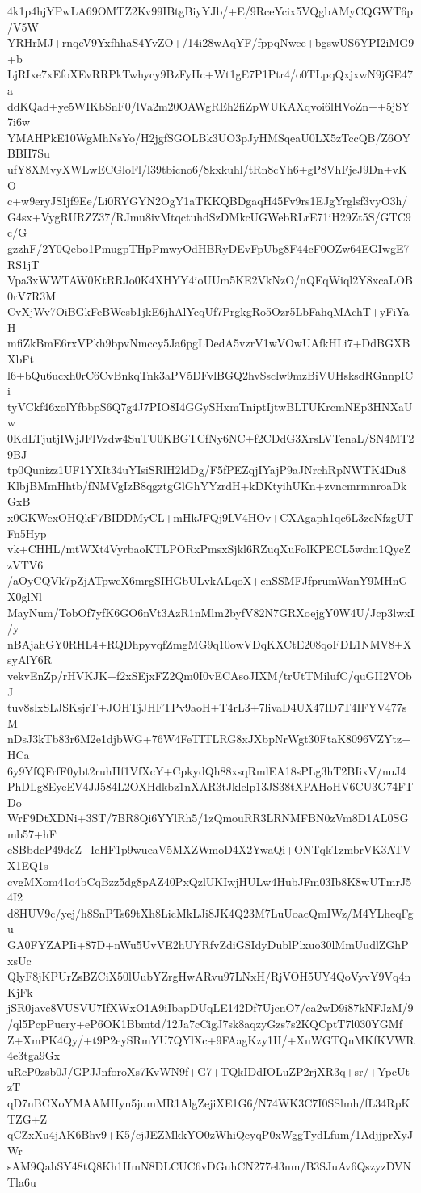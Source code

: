 4k1p4hjYPwLA69OMTZ2Kv99IBtgBiyYJb/+E/9RceYcix5VQgbAMyCQGWT6p/V5W
YRHrMJ+rnqeV9YxfhhaS4YvZO+/14i28wAqYF/fppqNwce+bgswUS6YPI2iMG9+b
LjRIxe7xEfoXEvRRPkTwhycy9BzFyHc+Wt1gE7P1Ptr4/o0TLpqQxjxwN9jGE47a
ddKQad+ye5WIKbSnF0/lVa2m20OAWgREh2fiZpWUKAXqvoi6lHVoZn++5jSY7i6w
YMAHPkE10WgMhNsYo/H2jgfSGOLBk3UO3pJyHMSqeaU0LX5zTccQB/Z6OYBBH7Su
ufY8XMvyXWLwECGloFl/l39tbicno6/8kxkuhl/tRn8cYh6+gP8VhFjeJ9Dn+vKO
c+w9eryJSIjf9Ee/Li0RYGYN2OgY1aTKKQBDgaqH45Fv9rs1EJgYrglsf3vyO3h/
G4sx+VygRURZZ37/RJmu8ivMtqctuhdSzDMkcUGWebRLrE71iH29Zt5S/GTC9c/G
gzzhF/2Y0Qebo1PmugpTHpPmwyOdHBRyDEvFpUbg8F44cF0OZw64EGIwgE7RS1jT
Vpa3xWWTAW0KtRRJo0K4XHYY4ioUUm5KE2VkNzO/nQEqWiql2Y8xcaLOB0rV7R3M
CvXjWv7OiBGkFeBWcsb1jkE6jhAlYcqUf7PrgkgRo5Ozr5LbFahqMAchT+yFiYaH
mfiZkBmE6rxVPkh9bpvNmccy5Ja6pgLDedA5vzrV1wVOwUAfkHLi7+DdBGXBXbFt
l6+bQu6ucxh0rC6CvBnkqTnk3aPV5DFvlBGQ2hvSsclw9mzBiVUHsksdRGnnpICi
tyVCkf46xolYfbbpS6Q7g4J7PIO8I4GGySHxmTniptIjtwBLTUKrcmNEp3HNXaUw
0KdLTjutjIWjJFlVzdw4SuTU0KBGTCfNy6NC+f2CDdG3XrsLVTenaL/SN4MT29BJ
tp0Qunizz1UF1YXIt34uYIsiSRlH2ldDg/F5fPEZqjIYajP9aJNrchRpNWTK4Du8
KlbjBMmHhtb/fNMVgIzB8qgztgGlGhYYzrdH+kDKtyihUKn+zvncmrmnroaDkGxB
x0GKWexOHQkF7BIDDMyCL+mHkJFQj9LV4HOv+CXAgaph1qc6L3zeNfzgUTFn5Hyp
vk+CHHL/mtWXt4VyrbaoKTLPORxPmsxSjkl6RZuqXuFolKPECL5wdm1QycZzVTV6
/aOyCQVk7pZjATpweX6mrgSIHGbULvkALqoX+cnSSMFJfprumWanY9MHnGX0glNl
MayNum/TobOf7yfK6GO6nVt3AzR1nMlm2byfV82N7GRXoejgY0W4U/Jcp3lwxI/y
nBAjahGY0RHL4+RQDhpyvqfZmgMG9q10owVDqKXCtE208qoFDL1NMV8+XsyAlY6R
vekvEnZp/rHVKJK+f2xSEjxFZ2Qm0I0vECAsoJIXM/trUtTMilufC/quGII2VObJ
tuv8slxSLJSKsjrT+JOHTjJHFTPv9aoH+T4rL3+7livaD4UX47ID7T4IFYV477sM
nDsJ3kTb83r6M2e1djbWG+76W4FeTITLRG8xJXbpNrWgt30FtaK8096VZYtz+HCa
6y9YfQFrfF0ybt2ruhHf1VfXcY+CpkydQh88xsqRmlEA18sPLg3hT2BIixV/nuJ4
PhDLg8EyeEV4JJ584L2OXHdkbz1nXAR3tJklelp13JS38tXPAHoHV6CU3G74FTDo
WrF9DtXDNi+3ST/7BR8Qi6YYlRh5/1zQmouRR3LRNMFBN0zVm8D1AL0SGmb57+hF
eSBbdcP49dcZ+IcHF1p9wueaV5MXZWmoD4X2YwaQi+ONTqkTzmbrVK3ATVX1EQ1s
cvgMXom41o4bCqBzz5dg8pAZ40PxQzlUKIwjHULw4HubJFm03Ib8K8wUTmrJ54I2
d8HUV9c/yej/h8SnPTs69tXh8LicMkLJi8JK4Q23M7LuUoacQmIWz/M4YLheqFgu
GA0FYZAPIi+87D+nWu5UvVE2hUYRfvZdiGSIdyDublPlxuo30lMmUudlZGhPxsUc
QlyF8jKPUrZsBZCiX50lUubYZrgHwARvu97LNxH/RjVOH5UY4QoVyvY9Vq4nKjFk
jSR0javc8VUSVU7IfXWxO1A9iIbapDUqLE142Df7UjcnO7/ca2wD9i87kNFJzM/9
/ql5PcpPuery+eP6OK1Bbmtd/12Ja7cCigJ7sk8aqzyGzs7s2KQCptT7l030YGMf
Z+XmPK4Qy/+t9P2eySRmYU7QYlXc+9FAagKzy1H/+XuWGTQnMKfKVWR4e3tga9Gx
uRcP0zsb0J/GPJJnforoXs7KvWN9f+G7+TQkIDdIOLuZP2rjXR3q+sr/+YpcUtzT
qD7nBCXoYMAAMHyn5jumMR1AlgZejiXE1G6/N74WK3C7I0SSlmh/fL34RpKTZG+Z
qCZxXu4jAK6Bhv9+K5/cjJEZMkkYO0zWhiQcyqP0xWggTydLfum/1AdjjprXyJWr
sAM9QahSY48tQ8Kh1HmN8DLCUC6vDGuhCN277el3nm/B3SJuAv6QszyzDVNTla6u
